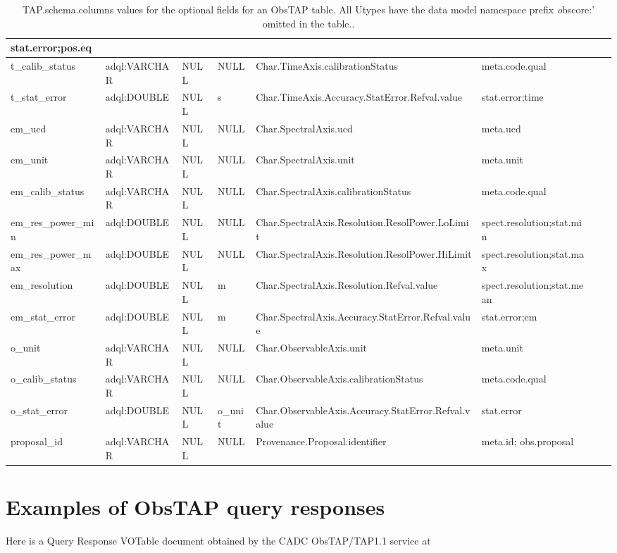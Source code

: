 \documentclass[11pt,a4paper]{ivoa}
\begin{document}
\begin{table}
\begin{tabular}{ | l | l | l | l | l | l | l | l}
stat.error;pos.eq
\\\hline
t\_calib\_status &
adql:VARCHAR &
NULL &
NULL &
Char.TimeAxis.calibrationStatus &
meta.code.qual
\\\hline
t\_stat\_error &
adql:DOUBLE &
NULL &
s &
Char.TimeAxis.Accuracy.StatError.Refval.value &
stat.error;time
\\\hline
em\_ucd &
adql:VARCHAR &
NULL &
NULL &
Char.SpectralAxis.ucd &
meta.ucd
\\\hline
em\_unit &
adql:VARCHAR &
NULL &
NULL &
Char.SpectralAxis.unit &
meta.unit
\\\hline
em\_calib\_status &
adql:VARCHAR &
NULL &
NULL &
Char.SpectralAxis.calibrationStatus &
meta.code.qual
\\\hline
em\_res\_power\_min &
adql:DOUBLE &
NULL &
NULL  &
Char.SpectralAxis.Resolution.ResolPower.LoLimit &
spect.resolution;stat.min
\\\hline
em\_res\_power\_max &
adql:DOUBLE &
NULL &
NULL &
Char.SpectralAxis.Resolution.ResolPower.HiLimit &
spect.resolution;stat.max
\\\hline
em\_resolution &
adql:DOUBLE &
NULL &
m &
Char.SpectralAxis.Resolution.Refval.value &
spect.resolution;stat.mean
\\\hline
em\_stat\_error &
adql:DOUBLE &
NULL &
m &
Char.SpectralAxis.Accuracy.StatError.Refval.value &
stat.error;em
\\\hline
o\_unit &
adql:VARCHAR &
NULL &
NULL &
Char.ObservableAxis.unit &
meta.unit
\\\hline
o\_calib\_status &
adql:VARCHAR &
NULL &
NULL &
Char.ObservableAxis.calibrationStatus &
meta.code.qual
\\\hline
o\_stat\_error &
adql:DOUBLE &
NULL &
o\_unit &
Char.ObservableAxis.Accuracy.StatError.Refval.value &
stat.error
\\\hline
proposal\_id &
adql:VARCHAR &
NULL &
NULL &
Provenance.Proposal.identifier &
meta.id; obs.proposal
\\\hline
\end{tabular}
\caption{TAP.schema.columns values for the optional fields for an ObsTAP table.  All Utypes have the data model namespace prefix {\emph obscore:'} omitted in the table..}
\label{table:tapschema-optional}
\end{table}

\section{Examples of ObsTAP query responses}
Here is a Query Response VOTable document obtained by the CADC ObsTAP/TAP1.1 service at
\end{document}
